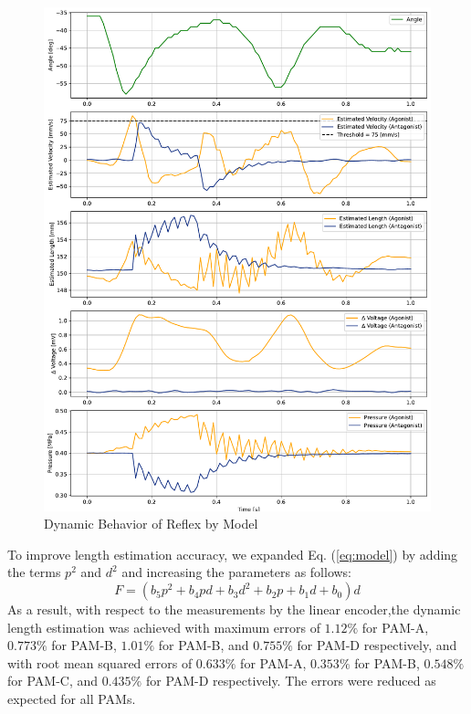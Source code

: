 \begin{figure}[t]
\begin{minipage}[H]{\textwidth}
\begin{minipage}[H]{0.48\textwidth}
            \includegraphics[width=\columnwidth]{fig/20240819_r20_reflex_all_plt.pdf}
            \caption{Dynamic Behavior of Reflex by Model}
            \label{fig:reflex_all}
        \end{minipage}
    \end{minipage}
\end{figure}


To improve length estimation accuracy, we expanded Eq. (\ref{eq:model}) by adding the terms $p^2$ and $d^2$ and increasing the parameters as follows:
\begin{equation}
\label{eq:model_2d(1)}
F = (b_5p^2 + b_4pd + b_3d^2 + b_2p+b_1d+b_0)d
\end{equation}
As a result, with respect to the measurements by the linear encoder,the dynamic length estimation was achieved with maximum errors of $1.12\%$ for PAM-A, $0.773\%$ for PAM-B, $1.01\%$ for PAM-B, and $0.755\%$ for PAM-D respectively, and with root mean squared errors of $0.633\%$ for PAM-A, $0.353\%$ for PAM-B, $0.548\%$ for PAM-C, and $0.435\%$ for PAM-D respectively. The errors were reduced as expected for all PAMs. 

